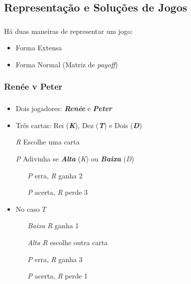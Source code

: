 \subsection{Representação e Soluções de Jogos}
\begin{frame}
\frametitle{\secname}
Há duas maneiras de representar um jogo:
\begin{itemize}
	\item Forma Extensa
	\item Forma Normal (Matriz de \emph{payoff})
\end{itemize}
\end{frame}

\subsubsection*{Renée v Peter}
\begin{frame}
\frametitle{\subsecname}
\begin{itemize}
	\item Dois jogadores: \textbf{\emph{Renée}} e \textbf{\emph{Peter}}
	\pause
	\item Três cartas: Rei (\textbf{\emph{K}}), Dez (\textbf{\emph{T}}) e Dois (\textbf{\emph{D}})
	\pause
	\item[\emph{R}] Escolhe uma carta
	\pause
	\item[\emph{P}] Adivinha se \emph{\textbf{Alta}} (\emph{K}) ou \emph{\textbf{Baixa}} (\emph{D})
	\pause
	\begin{itemize}
		\item[\emph{P}] erra, \emph{R} ganha 2
		\pause
		\item[\emph{P}] acerta, \emph{R} perde 3
	\end{itemize}
	\pause
	\item No caso $T$
	\pause
	\begin{itemize}
		\item[\emph{Baixa}] \emph{R} ganha 1
		\pause
		\item[\emph{Alta}] \emph{R} escolhe outra carta
	\end{itemize}
	\pause
	\begin{itemize}
		\item[\emph{P}] erra, \emph{R} ganha 3
		\pause
		\item[\emph{P}] acerta, \emph{R} perde 1
	\end{itemize}
\end{itemize}
\end{frame}

